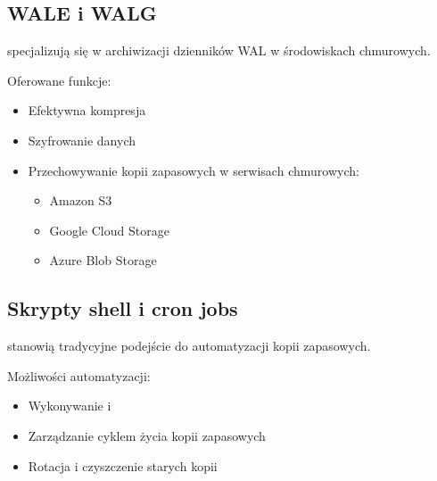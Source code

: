 \documentclass[letterpaper,10pt,polish]{sphinxmanual}
\begin{document}
\subsection{WAL\sphinxhyphen{}E i WAL\sphinxhyphen{}G}
\label{\detokenize{kopie_zapasowe_i_odzyskiwanie_danych:wal-e-i-wal-g}}
\sphinxAtStartPar
{} specjalizują się w archiwizacji dzienników WAL w środowiskach chmurowych.

\sphinxAtStartPar
Oferowane funkcje:
\begin{itemize}
\item {} 
\sphinxAtStartPar
Efektywna kompresja

\item {} 
\sphinxAtStartPar
Szyfrowanie danych

\item {} 
\sphinxAtStartPar
Przechowywanie kopii zapasowych w serwisach chmurowych:
\begin{itemize}
\item {} 
\sphinxAtStartPar
Amazon S3

\item {} 
\sphinxAtStartPar
Google Cloud Storage

\item {} 
\sphinxAtStartPar
Azure Blob Storage

\end{itemize}

\end{itemize}


\subsection{Skrypty shell i cron jobs}
\label{\detokenize{kopie_zapasowe_i_odzyskiwanie_danych:skrypty-shell-i-cron-jobs}}
\sphinxAtStartPar
{} stanowią tradycyjne podejście do automatyzacji kopii zapasowych.

\sphinxAtStartPar
Możliwości automatyzacji:
\begin{itemize}
\item {} 
\sphinxAtStartPar
Wykonywanie  i 

\item {} 
\sphinxAtStartPar
Zarządzanie cyklem życia kopii zapasowych

\item {} 
\sphinxAtStartPar
Rotacja i czyszczenie starych kopii

\end{itemize}
\end{document}
